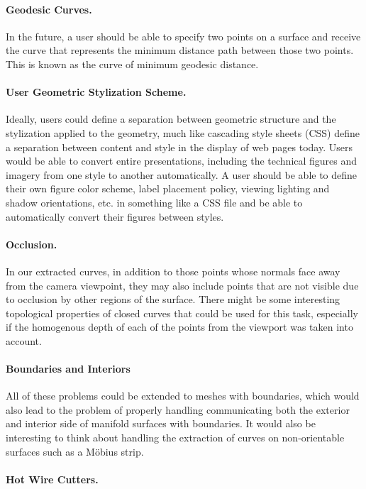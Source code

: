 \documentclass[12pt, letterpaper]{article}
\begin{document}
		\paragraph{Geodesic Curves.}
		In the future, a user should be able to specify two points on a surface and receive the curve that represents the minimum distance path between those two points.
		This is known as the curve of minimum geodesic distance.
	
		\paragraph{User Geometric Stylization Scheme.}
		Ideally, users could define a separation between geometric structure and the stylization applied to the geometry, much like cascading style sheets (CSS)
		define a separation between content and style in the display of web pages today. 
		Users would be able to convert entire presentations, including the technical figures and imagery from one style to another automatically.
		A user should be able to define their own figure color scheme, label placement policy, viewing lighting and shadow orientations, etc. in something like a CSS file and be able to automatically convert their figures between styles.

		\paragraph{Occlusion.}

		In our extracted curves, in addition to those points whose normals face away from the camera viewpoint,
		they may also include points that are not visible due to occlusion by other regions of the surface.
		There might be some interesting topological properties of closed curves that could be used for this task,
		especially if the homogenous depth of each of the points from the viewport was taken into account.

		\paragraph{Boundaries and Interiors}
		All of these problems could be extended to meshes with boundaries, which would also lead to the problem
		of properly handling communicating both the exterior and interior side of manifold surfaces with boundaries.
		It would also be interesting to think about handling the extraction of curves on non-orientable surfaces such as a M\"obius strip.

		\paragraph{Hot Wire Cutters.}
\end{document}
